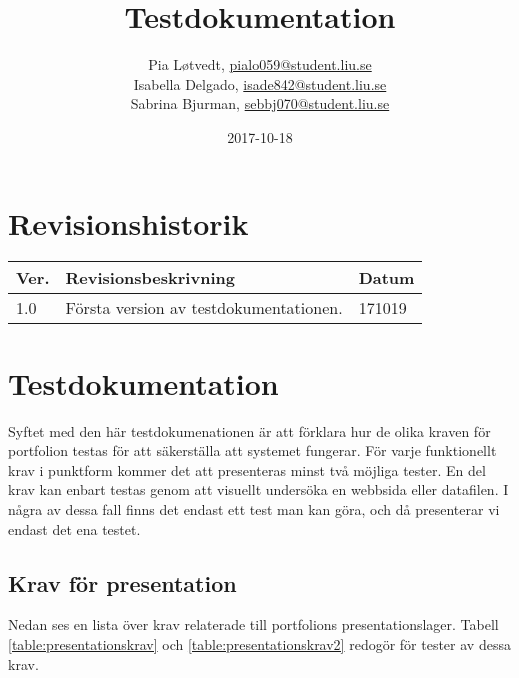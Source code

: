 \documentclass{TDP003mall}
\author{Pia Løtvedt, \url{pialo059@student.liu.se}\\
  Isabella Delgado, \url{isade842@student.liu.se}\\
  Sabrina Bjurman, \url{sebbj070@student.liu.se}}
\title{Testdokumentation}
\date{2017-10-18}
\begin{document}
\projectpage

\tableofcontents
\pagebreak
\section{Revisionshistorik}
\begin{table}[!h]
\begin{tabularx}{\linewidth}{|l|X|l|}
\hline
Ver. & Revisionsbeskrivning & Datum \\\hline
1.0 & Första version av testdokumentationen. & 171019 \\\hline
\end{tabularx}
\end{table}


\section{Testdokumentation}

Syftet med den här testdokumenationen är att förklara hur de olika kraven för portfolion testas för att säkerställa att systemet fungerar. För varje funktionellt krav i punktform kommer det att presenteras minst två möjliga tester. En del krav kan enbart testas genom att visuellt undersöka en webbsida eller datafilen. I några av dessa fall finns det endast ett test man kan göra, och då presenterar vi endast det ena testet. 

\subsection{Krav för presentation}




Nedan ses en lista över krav relaterade till portfolions presentationslager. Tabell \ref{table:presentationskrav} och \ref{table:presentationskrav2} redogör för tester av dessa krav.
\end{document}
